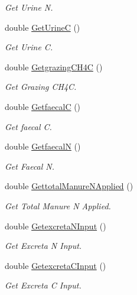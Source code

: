 \begin{DoxyCompactItemize}
\begin{DoxyCompactList}\small\item\em Get Urine N. \end{DoxyCompactList}\item 
double \mbox{\hyperlink{class_crop_class_a9a4e61a257813bdea4ce3bad42dd6ef7}{Get\+UrineC}} ()
\begin{DoxyCompactList}\small\item\em Get Urine C. \end{DoxyCompactList}\item 
double \mbox{\hyperlink{class_crop_class_af1de6b2cbc183ba46bf279fe04a32173}{Getgrazing\+C\+H4C}} ()
\begin{DoxyCompactList}\small\item\em Get Grazing C\+H4C. \end{DoxyCompactList}\item 
double \mbox{\hyperlink{class_crop_class_a26c9d82c2f4d98dc994f19f3af374f2c}{GetfaecalC}} ()
\begin{DoxyCompactList}\small\item\em Get faecal C. \end{DoxyCompactList}\item 
double \mbox{\hyperlink{class_crop_class_aa08fbfc8bd23ced35bf9e4dcf491f780}{GetfaecalN}} ()
\begin{DoxyCompactList}\small\item\em Get Faecal N. \end{DoxyCompactList}\item 
double \mbox{\hyperlink{class_crop_class_afa8dfc58b5ac99a5584c8964856ab573}{Gettotal\+Manure\+N\+Applied}} ()
\begin{DoxyCompactList}\small\item\em Get Total Manure N Applied. \end{DoxyCompactList}\item 
double \mbox{\hyperlink{class_crop_class_acb2d5fbc6a129de60d98ed8fd444a202}{Getexcreta\+N\+Input}} ()
\begin{DoxyCompactList}\small\item\em Get Excreta N Input. \end{DoxyCompactList}\item 
double \mbox{\hyperlink{class_crop_class_a4459b8aeaed3801ec98f64ffe5faf121}{Getexcreta\+C\+Input}} ()
\begin{DoxyCompactList}\small\item\em Get Excreta C Input. \end{DoxyCompactList}\item 

\end{DoxyCompactItemize}
